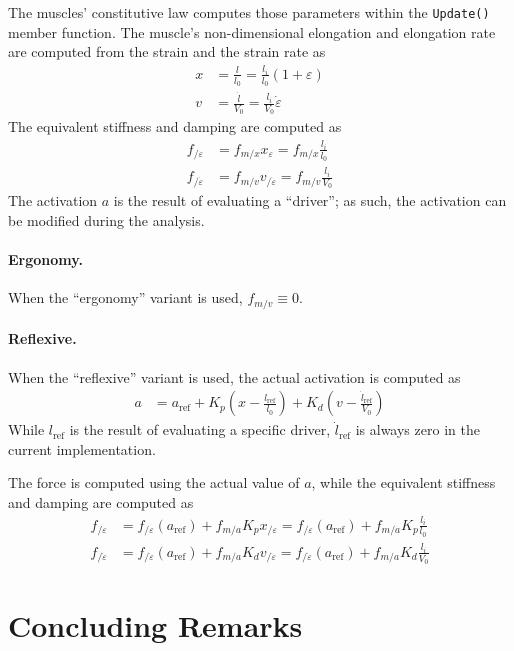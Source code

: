 \documentclass{article}
\begin{document}
The muscles' constitutive law computes those parameters
within the \texttt{Update()} member function.
The muscle's non-dimensional elongation and elongation rate
are computed from the strain and the strain rate as
\begin{subequations}
\begin{align}
	x
	&=
	\frac{l}{l_0}
	=
	\frac{l_i}{l_0}(1 + \varepsilon)
	\\
	v
	&=
	\frac{\dot{l}}{V_0}
	=
	\frac{l_i}{V_0} \dot{\varepsilon}
\end{align}
\end{subequations}
The equivalent stiffness and damping are computed as
\begin{subequations}
\begin{align}
	f_{/\varepsilon}
	&=
	f_{m/x} x_{\varepsilon}
	=
	f_{m/x} \frac{l_i}{l_0}
	\\
	f_{/\dot{\varepsilon}}
	&=
	f_{m/v} v_{/\dot{\varepsilon}}
	=
	f_{m/v} \frac{l_i}{V_0}
\end{align}
\end{subequations}
The activation $a$ is the result of evaluating a ``driver'';
as such, the activation can be modified during the analysis.

\paragraph{Ergonomy.}
When the ``ergonomy'' variant is used, $f_{m/v} \equiv 0$.

\paragraph{Reflexive.}
When the ``reflexive'' variant is used, the actual activation
is computed as
\begin{align}
	a
	&=
	a_\text{ref}
	+
	K_p \left( x - \frac{l_\text{ref}}{l_0} \right)
	+
	K_d \left( v - \frac{\dot{l}_\text{ref}}{V_0} \right)
\end{align}
While $l_\text{ref}$ is the result of evaluating a specific driver,
$\dot{l}_\text{ref}$ is always zero in the current implementation.

The force is computed using the actual value of $a$,
while the equivalent stiffness and damping are computed as
\begin{subequations}
\begin{align}
	f_{/\varepsilon}
	&=
	f_{/\varepsilon}(a_\text{ref})
	+
	f_{m/a} K_p x_{/\varepsilon}
	=
	f_{/\varepsilon}(a_\text{ref})
	+
	f_{m/a} K_p \frac{l_i}{l_0}
	\\
	f_{/\dot{\varepsilon}}
	&=
	f_{/\dot{\varepsilon}}(a_\text{ref})
	+
	f_{m/a} K_d v_{/\dot{\varepsilon}}
	=
	f_{/\dot{\varepsilon}}(a_\text{ref})
	+
	f_{m/a} K_d \frac{l_i}{V_0}
\end{align}
\end{subequations}


\section{Concluding Remarks}
\end{document}
